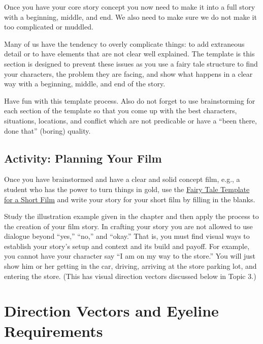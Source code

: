\documentclass[
]{book}
\begin{document}
Once you have your core story concept you now need to make it into a full story with a beginning, middle, and end. We also need to make sure we do not make it too complicated or muddled.

Many of us have the tendency to overly complicate things: to add extraneous detail or to have elements that are not clear well explained. The template is this section is designed to prevent these issues as you use a fairy tale structure to find your characters, the problem they are facing, and show what happens in a clear way with a beginning, middle, and end of the story.

Have fun with this template process. Also do not forget to use brainstorming for each section of the template so that you come up with the best characters, situations, locations, and conflict which are not predicable or have a ``been there, done that'' (boring) quality.

\hypertarget{activity-planning-your-film}{%
\subsection*{Activity: Planning Your Film}\label{activity-planning-your-film}}

\begin{reflect}
Once you have brainstormed and have a clear and solid concept film, e.g., a student who has the power to turn things in gold, use the \href{assets/unit6/Fairy_Tale_Template_for_a_Short_Film.pdf}{Fairy Tale Template for a Short Film} and write your story for your short film by filling in the blanks.

Study the illustration example given in the chapter and then apply the process to the creation of your film story. In crafting your story you are not allowed to use dialogue beyond ``yes,'' ``no,'' and ``okay.'' That is, you must find visual ways to establish your story's setup and context and its build and payoff. For example, you cannot have your character say ``I am on my way to the store.'' You will just show him or her getting in the car, driving, arriving at the store parking lot, and entering the store. (This has visual direction vectors discussed below in Topic 3.)
\end{reflect}

\hypertarget{direction-vectors-and-eyeline-requirements}{%
\section{Direction Vectors and Eyeline Requirements}\label{direction-vectors-and-eyeline-requirements}}
\end{document}
